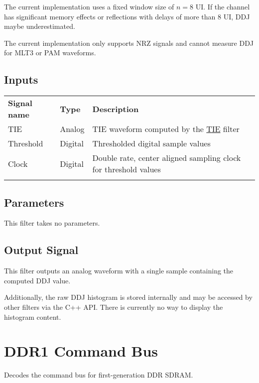 The current implementation uses a fixed window size of $n=8$ UI. If the channel has significant memory effects or
reflections with delays of more than 8 UI, DDJ maybe underestimated.

The current implementation only supports NRZ signals and cannot measure DDJ for MLT3 or PAM waveforms.

\subsection{Inputs}

\begin{tabularx}{16cm}{llX}
\thickhline
\textbf{Signal name} & \textbf{Type} & \textbf{Description} \\
\thickhline
TIE & Analog & TIE waveform computed by the \hyperref[filter:tie]{TIE} filter\\
\thinhline
Threshold & Digital & Thresholded digital sample values\\
\thinhline
Clock & Digital & Double rate, center aligned sampling clock for threshold values\\
\thickhline
\end{tabularx}

\subsection{Parameters}

This filter takes no parameters.

\subsection{Output Signal}

This filter outputs an analog waveform with a single sample containing the computed DDJ value.

Additionally, the raw DDJ histogram is stored internally and may be accessed by other filters via the C++ API. There is
currently no way to display the histogram content.

\pagebreak
\section{DDR1 Command Bus}

Decodes the command bus for first-generation DDR SDRAM.

\pagebreak
